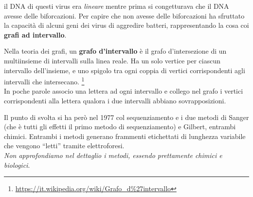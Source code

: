 \documentclass[a4paper,12pt, oneside]{book}
\begin{document}
il DNA di questi virus era \textit{lineare} mentre prima si congetturava che il
DNA avesse delle biforcazioni. Per capire che non avesse delle biforcazioni ha
sfruttato la capacità di alcuni geni dei virus di aggredire batteri,
rappresentando la cosa coi \textbf{grafi ad intervallo}.
\begin{definizione}
  Nella teoria dei grafi, un \textbf{grafo d'intervallo} è il grafo
  d'intersezione di un 
  multiinsieme di intervalli sulla linea reale. Ha un solo vertice per ciascun
  intervallo dell'insieme, e uno spigolo tra ogni coppia di vertici
  corrispondenti agli intervalli che
  intersecano.
  \footnote{\url{https://it.wikipedia.org/wiki/Grafo\_d\%27intervallo}}\\
  In poche parole associo una lettera ad ogni intervallo e collego nel grafo i
  vertici corrispondenti alla lettera qualora i due intervalli abbiano
  sovrapposizioni.
\end{definizione}
Il punto di svolta si ha però nel 1977 col sequenziamento e i due metodi di
Sanger (che è tutti gli effetti il primo metodo di sequenziamento) e Gilbert,
entrambi chimici. Entrambi i metodi generano frammenti etichettati di lunghezza
variabile che vengono ``letti'' tramite elettroforesi. \\
\textit{Non approfondiamo nel dettaglio i metodi, essendo prettamente chimici e
  biologici}.
\end{document}
